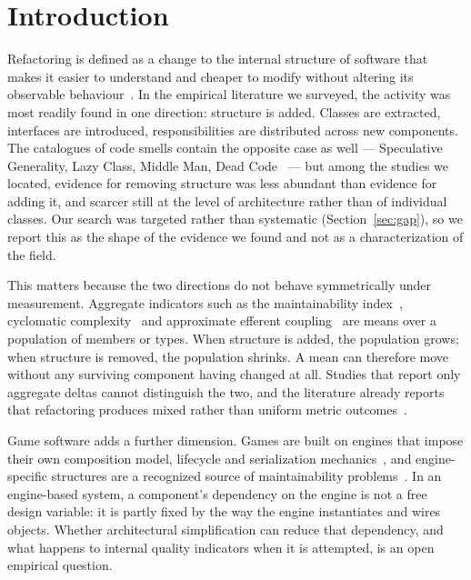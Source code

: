 \documentclass[pdflatex,sn-basic]{sn-jnl}
\begin{document}
\maketitle

\section{Introduction}

Refactoring is defined as a change to the internal structure of software that makes it easier to understand and cheaper to modify without altering its observable behaviour~\citep{fowler2018,mens2004}. In the empirical literature we surveyed, the activity was most readily found in one direction: structure is added. Classes are extracted, interfaces are introduced, responsibilities are distributed across new components. The catalogues of code smells contain the opposite case as well --- Speculative Generality, Lazy Class, Middle Man, Dead Code~\citep{fowler2018} --- but among the studies we located, evidence for removing structure was less abundant than evidence for adding it, and scarcer still at the level of architecture rather than of individual classes. Our search was targeted rather than systematic (Section~\ref{sec:gap}), so we report this as the shape of the evidence we found and not as a characterization of the field.

This matters because the two directions do not behave symmetrically under measurement. Aggregate indicators such as the maintainability index~\citep{coleman1994}, cyclomatic complexity~\citep{mccabe1976} and approximate efferent coupling~\citep{martin2003} are means over a population of members or types. When structure is added, the population grows; when structure is removed, the population shrinks. A mean can therefore move without any surviving component having changed at all. Studies that report only aggregate deltas cannot distinguish the two, and the literature already reports that refactoring produces mixed rather than uniform metric outcomes~\citep{szoke2017,bavota2015,palomba2018}.

Game software adds a further dimension. Games are built on engines that impose their own composition model, lifecycle and serialization mechanics~\citep{aleem2016,politowski2025}, and engine-specific structures are a recognized source of maintainability problems~\citep{nardone2023,borrelli2020}. In an engine-based system, a component's dependency on the engine is not a free design variable: it is partly fixed by the way the engine instantiates and wires objects. Whether architectural simplification can reduce that dependency, and what happens to internal quality indicators when it is attempted, is an open empirical question.
\end{document}
